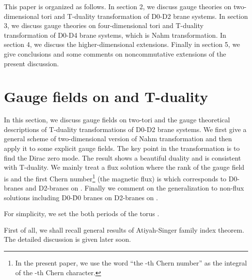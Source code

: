 \documentclass[a4paper,epsf,12pt]{article}
\begin{document}
This paper is organized as follows.
In section 2, we discuss gauge theories on two-dimensional tori and 
T-duality transformation of D0-D2 brane systems.
In section 3, we discuss gauge theories on four-dimensional tori and 
T-duality transformation of D0-D4 brane systems, which is Nahm transformation.
In section 4, we discuss the higher-dimensional extensions.
Finally in section 5, we give conclusions and 
some comments on noncommutative extensions of the present discussion.

\section{Gauge fields on \coordHE{} and T-duality}

In this section, we discuss gauge fields on two-tori \coordHE{}
and the gauge theoretical descriptions of T-duality transformations
of D0-D2 brane systems.
We first give a general scheme of two-dimensional version of 
Nahm transformation and then apply it to
some explicit gauge fields.
The key point in the transformation is to find the Dirac zero mode.
The result shows a beautiful duality and is consistent with T-duality.
We mainly treat a flux solution where the rank of the gauge field
is \coordHE{} and the first Chern number\footnote{In the present paper, we use
the word ``the \coordHE{}-th Chern number'' as the integral 
of the \coordHE{}-th Chern character.} (the magnetic flux) is \coordHE{}
which corresponds to \coordHE{} D0-branes and \coordHE{} D2-branes on \coordHE{}. 
Finally we comment on the generalization to non-flux solutions 
including  D0-\=D0 branes on D2-branes on \coordHE{}.

For simplicity, we set the both periods of the torus \coordHE{}  \myHighlight{$2\pi$}\coordHE{}.

\vspace{2mm}

First of all, we shall recall general results of Atiyah-Singer 
family index theorem.
The detailed discussion is given later soon.
\end{document}
